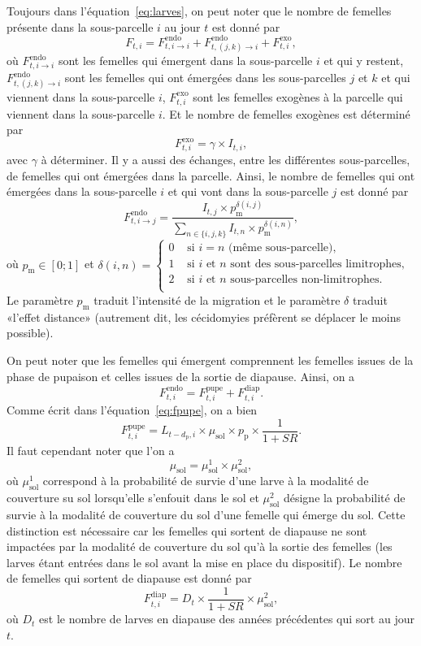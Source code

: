 Toujours dans l'équation~\ref{eq:larves}, on peut noter que le nombre de femelles présente dans la sous-parcelle $i$ au jour $t$ est donné par
\[
F_{t, i} = F^{\text{endo}}_{t, i\rightarrow i} + F^{\text{endo}}_{t, (j,k)\rightarrow i} + F^{\text{exo}}_{t, i}\!,
\]
où $F^{\text{endo}}_{t, i\rightarrow i}$ sont les femelles qui émergent dans la sous-parcelle $i$ et qui y restent, $F^{\text{endo}}_{t, (j,k)\rightarrow i}$ sont les femelles qui ont émergées dans les sous-parcelles $j$ et $k$ et qui viennent dans la sous-parcelle $i$, $F^{\text{exo}}_{t, i}$ sont les femelles exogènes à la parcelle qui viennent dans la sous-parcelle $i$.
Et le nombre de femelles exogènes est déterminé par
\[
F^{\text{exo}}_{t, i} = \gamma \times I_{t, i},
\]
avec $\gamma$ à déterminer.
Il y a aussi des échanges, entre les différentes sous-parcelles, de femelles qui ont émergées dans la parcelle.
Ainsi, le nombre de femelles qui ont émergées dans la sous-parcelle $i$ et qui vont dans la sous-parcelle $j$ est donné par
\[
F_{t, i \rightarrow j}^{\text{endo}} = \frac{I_{t, j} \times p_{\text{m}}^{\delta(i, j)}}{\sum_{n\in \{i,j,k\}} I_{t, n} \times p_{\text{m}}^{\delta(i, n)}},
\]
où $p_{\text{m}} \in [0; 1]$ et $\delta(i, n) =
\begin{cases}
0 & \text{ si } i=n \text{ (même sous-parcelle),}\\
1 & \text{ si $i$ et $n$ sont des sous-parcelles limitrophes,}\\
2 & \text{ si $i$ et $n$ sous-parcelles non-limitrophes.}\\
\end{cases}$\\
Le paramètre $p_{\text{m}}$ traduit l'intensité de la migration et le paramètre $\delta$ traduit «l'effet distance» (autrement dit, les cécidomyies préfèrent se déplacer le moins possible).

On peut noter que les femelles qui émergent comprennent les femelles issues de la phase de pupaison et celles issues de la sortie de diapause. Ainsi, on a
\[
F^{\text{endo}}_{t, i} = F^{\text{pupe}}_{t, i} + F^{\text{diap}}_{t,i}.
\]
Comme écrit dans l'équation~\ref{eq:fpupe}, on a bien
\[
F^{\text{pupe}}_{t, i} = L_{t - d_{\text{p}}, i} \times \mu_{\text{sol}} \times p_{\text{p}} \times \frac{1}{1 + \mathit{SR}}.
\]
Il faut cependant noter que l'on a
\[
\mu_{\text{sol}} = \mu_{\text{sol}}^1 \times \mu_{\text{sol}}^2,
\]
où $\mu_{\text{sol}}^1$ correspond à la probabilité de survie d'une larve à la modalité de couverture su sol lorsqu'elle s'enfouit dans le sol et $\mu_{\text{sol}}^2$ désigne la probabilité de survie à la modalité de couverture du sol d'une femelle qui émerge du sol.
Cette distinction est nécessaire car les femelles qui sortent de diapause ne sont impactées par la modalité de couverture du sol qu'à la sortie des femelles (les larves étant entrées dans le sol avant la mise en place du dispositif).
Le nombre de femelles qui sortent de diapause est donné par 
\[
F_{t, i}^{\text{diap}} = D_{t} \times \frac{1}{1 + \mathit{SR}} \times \mu^{2}_{\text{sol}},
\]
où $D_{t}$ est le nombre de larves en diapause des années précédentes qui sort au jour $t$.


